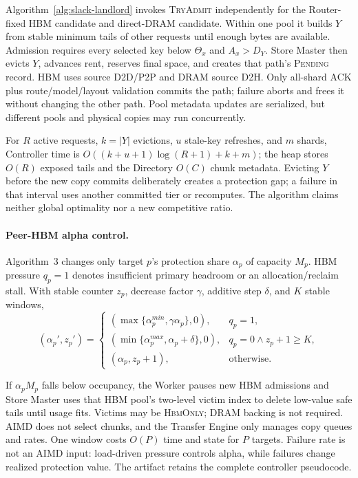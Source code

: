 Algorithm~\ref{alg:slack-landlord} invokes \textsc{TryAdmit} independently for
the Router-fixed HBM candidate and direct-DRAM candidate.  Within one pool it
builds $Y$ from stable minimum tails of other requests until enough bytes are
available.  Admission requires every selected key below $\Theta_x$ and
$A_x>D_Y$.  Store Master then evicts $Y$, advances rent, reserves final space,
and creates that path's \textsc{Pending} record.  HBM uses source D2D/P2P and
DRAM source D2H.  Only all-shard ACK plus route/model/layout validation commits
the path; failure aborts and frees it without changing the other path.  Pool
metadata updates are serialized, but different pools and physical copies may
run concurrently.



For $R$ active requests, $k=|Y|$ evictions, $u$ stale-key refreshes, and $m$
shards, Controller time is $O((k+u+1)\log(R+1)+k+m)$; the heap stores $O(R)$
exposed tails and the Directory $O(C)$ chunk metadata.
Evicting $Y$ before the new copy commits deliberately creates a protection
gap; a failure in that interval uses another committed tier or recomputes.
The algorithm claims neither global optimality nor a new competitive ratio.

\paragraph{Peer-HBM alpha control.}
Algorithm~3 changes only target $p$'s protection share
$\alpha_p$ of capacity $M_p$.  HBM pressure $q_p=1$ denotes insufficient
primary headroom or an allocation/reclaim stall.  With stable counter $z_p$,
decrease factor $\gamma$, additive step $\delta$, and $K$ stable windows,
\begin{equation}
 (\alpha_p',z_p')=
 \begin{cases}
 (\max\{\alpha_p^{min},\gamma\alpha_p\},0),&q_p=1,\\
 (\min\{\alpha_p^{max},\alpha_p+\delta\},0),
   &q_p=0\land z_p+1\ge K,\\
 (\alpha_p,z_p+1),&\text{otherwise}.
 \end{cases}
 \label{eq:guarded-aimd}
\end{equation}

If $\alpha_pM_p$ falls below occupancy, the Worker pauses new HBM admissions
and Store Master uses that HBM pool's two-level victim index to delete
low-value safe tails until usage fits.  Victims may be \textsc{HbmOnly}; DRAM
backing is not required.  AIMD does not select chunks, and the Transfer Engine
only manages copy queues and rates.  One window costs $O(P)$ time and state for
$P$ targets.  Failure rate is not an AIMD input: load-driven pressure controls
alpha, while failures change realized protection value.  The artifact retains
the complete controller pseudocode.

